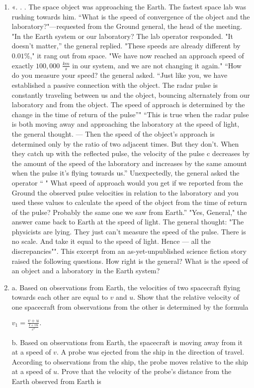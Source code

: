 \documentclass{article}
\begin{document}
\begin{enumerate}[label=14.1.\arabic*]
\item «. . . The space object was approaching the Earth. The fastest space lab was rushing towards him. “What is the speed of convergence of the object and the laboratory?"—requested from the Ground general, the head of the meeting. "In the Earth system or our laboratory? The lab operator responded. "It doesn't matter,” the general replied. "These speeds are already different by $0.01\%$," it rang out from space. "We have now reached an approach speed of exactly $100,000$ $\frac{km}{s}$ in our system, and we are not changing it again." “How do you measure your speed? the general asked. “Just like you, we have established a passive connection with the object. The radar pulse is constantly traveling between us and the object, bouncing alternately from our laboratory and from the object. The speed of approach is determined by the change in the time of return of the pulse”" “This is true when the radar pulse is both moving away and approaching the laboratory at the speed of light, the general thought. — Then the speed of the object's approach is determined only by the ratio of two adjacent times. But they don't. When they catch up with the reflected pulse, the velocity of the pulse c decreases by the amount of the speed of the laboratory and increases by the same amount when the pulse it's flying towards us.” Unexpectedly, the general asked the operator “ " What speed of approach would you get if we reported from the Ground the observed pulse velocities in relation to the laboratory and you used these values to calculate the speed of the object from the time of return of the pulse? Probably the same one we saw from Earth.” "Yes, General," the answer came back to Earth at the speed of light. The general thought: "The physicists are lying. They just can't measure the speed of the pulse. There is no scale. And take it equal to the speed of light. Hence — all the discrepancies"". This excerpt from an as-yet-unpublished science fiction story raised the following questions. How right is the general? What is the speed of an object and a laboratory in the Earth system?

\item a. Based on observations from Earth, the velocities of two spacecraft flying towards each other are equal to $v$ and $u$. Show that the relative velocity of one spacecraft from observations from the other is determined by the formula 

$v_1 = \frac{v + u}{\frac{I + vu}{c^2}}.$ 

b. Based on observations from Earth, the spacecraft is moving away from it at a speed of $v$. A probe was ejected from the ship in the direction of travel. According to observations from the ship, the probe moves relative to the ship at a speed of $u$. Prove that the velocity of the probe's distance from the Earth observed from Earth is 


\end{enumerate}
\end{document}
